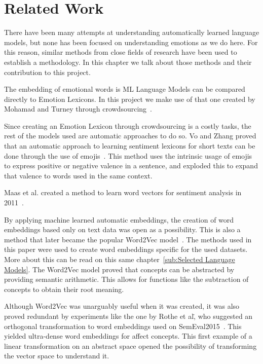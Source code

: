 \chapter{Related Work}\label{chap:Related Work}

There have been many attempts at understanding automatically learned language models, but none has been focused on understanding emotions as we do here. For this reason, similar methods from close fields of research have been used to establish a methodology. In this chapter we talk about those methods and their contribution to this project.

The embedding of emotional words is ML Language Models can be compared directly to Emotion Lexicons. In this project we make use of that one created by Mohamad and Turney through crowdsourcing~\cite{mohammad2013crowdsourcing}. %


Since creating an Emotion Lexicon through crowdsourcing is a costly tasks, the rest of the models used are automatic approaches to do so. Vo and Zhang proved that an automatic approach to learning sentiment lexicons for short texts can be done through the use of emojis~\cite{vo2016count}. This method uses the intrinsic usage of emojis to express positive or negative valence in a sentence, and exploded this to expand that valence to words used in the same context.

Maas et al. created a method to learn word vectors for sentiment analysis in 2011~\cite{maas2011learning}.

By applying machine learned automatic embeddings, the creation of word embeddings based only on text data was open as a possibility. This is also a method that later became the popular Word2Vec model~\cite{mikolov2013word2vec}. The methods used in this paper were used to create word embeddings specific for the used datasets. More about this can be read on this same chapter~\ref{sub:Selected Language Models}. The Word2Vec model proved that concepts can be abstracted by providing semantic arithmetic. This allows for functions like the subtraction of concepts to obtain their root meaning.

Although Word2Vec was unarguably useful when it was created, it was also proved redundant by experiments like the one by Rothe et al\., who suggested an orthogonal transformation to word embeddings used on SemEval2015~\cite{rothe2016orthogonal}. This yielded ultra-dense word embeddings for affect concepts. This first example of a linear transformation on an abstract space opened the possibility of transforming the vector space to understand it.

